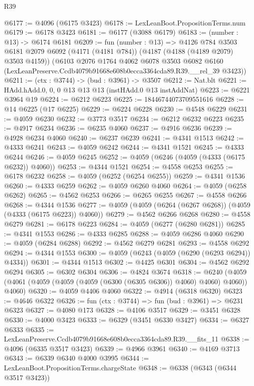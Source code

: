 \begin{lexlean}{R39}
\begin{coremodule}
@6177 := @4096 (@6175 @3423)
@6178 := LexLeanBoot.PropositionTerms.num
@6179 := @6178 @3423
@6181 := @6177 (@3088 @6179)
@6183 := (number : @13) -> @6174 @6181
@6209 := fun (number : @13) =>
  @4126
    @784
    @3503
    @6181
    @2079
    @6092
    (@4171 (@4181 @784))
    (@4187 (@4188 (@4189 @2079) @3503 @4159))
    (@6103
      @2076
      @1764
      @4062
      @6078
      @3503
      @6082
      @6160
      (LexLeanPreserve.Ccdb4079b91668e608b0ecca3364cda89.R39.__rel_39 @3423))
@6211 := (ctx : @3744) -> (bud : @3961) -> @3507
@6212 := Nat.blt
@6221 := HAdd.hAdd.{0, 0, 0} @13 @13 @13 (instHAdd.{0} @13 instAddNat)
@6223 := @6221 @3964 @19
@6224 := @6212 @6223
@6225 := 18446744073709551616
@6228 := @14 @6225 (@17 @6225)
@6229 := @6224 @6228
@6230 := @4548 @6229
@6231 := @4059 @6230
@6232 := @3773 @3517
@6234 := @6212 @6232 @6223
@6235 := @4917 @6234
@6236 := @6235 @4060
@6237 := @4916 @6236
@6239 := @4928 @6234 @4060
@6240 := @6237 @6239
@6241 := @4341 @1513
@6242 := @4333 @6241
@6243 := @4059 @6242
@6244 := @4341 @1521
@6245 := @4333 @6244
@6246 := @4059 @6245
@6252 := @4059 (@6246 (@4059 (@4333 (@6175 @6232)) @4060))
@6253 := @4344 @1521
@6254 := @4558 @6253
@6255 := @6178 @6232
@6258 := @4059 (@6252 (@6254 @6255))
@6259 := @4341 @1536
@6260 := @4333 @6259
@6262 := @4059 @6260 @4060
@6264 := @4059 (@6258 @6262)
@6265 := @4562 @6253
@6266 := @6265 @6255
@6267 := @4558 @6266
@6268 := @4344 @1536
@6277 := @4059 (@4059 (@6264 (@6267 @6268)) (@4059 (@4333 (@6175 @6223)) @4060))
@6279 := @4562 @6266 @6268
@6280 := @4558 @6279
@6281 := @6178 @6223
@6284 := @4059 (@6277 (@6280 @6281))
@6285 := @4341 @1553
@6286 := @4333 @6285
@6288 := @4059 @6286 @4060
@6290 := @4059 (@6284 @6288)
@6292 := @4562 @6279 @6281
@6293 := @4558 @6292
@6294 := @4344 @1553
@6300 := @4059 (@6243 (@4059 (@6290 (@6293 @6294)) @4334))
@6301 := @4344 @1513
@6302 := @4425 @6301
@6304 := @4562 @6292 @6294
@6305 := @6302 @6304
@6306 := @4824 @3674
@6318 := @6240 (@4059 (@4061 (@4059 (@4059 (@4059 (@6300 (@6305 @6306)) @4060) @4060) @4060)) @4060)
@6320 := @4059 @4406 @4060
@6322 := @4914 (@6318 @6320)
@6323 := @4646 @6322
@6326 := fun (ctx : @3744) => fun (bud : @3961) => @6231 @6323
@6327 := @4080 @173
@6328 := @4106 @3517
@6329 := @3451 @6328
@6330 := @4000 @3423
@6333 := @6329 (@3451 @6330 @3427)
@6334 := @6327 @6333
@6335 := LexLeanPreserve.Ccdb4079b91668e608b0ecca3364cda89.R39.__fits_11
@6338 := @4096 (@6335 @3517 @3423)
@6339 := @4966 @3961
@6340 := @4169 @3713
@6343 := @6339 @6340 @4000 @3995
@6344 := LexLeanBoot.PropositionTerms.chargeState
@6348 := @6338 (@6343 (@6344 @3517 @3423))

\end{coremodule}
\end{lexlean}
